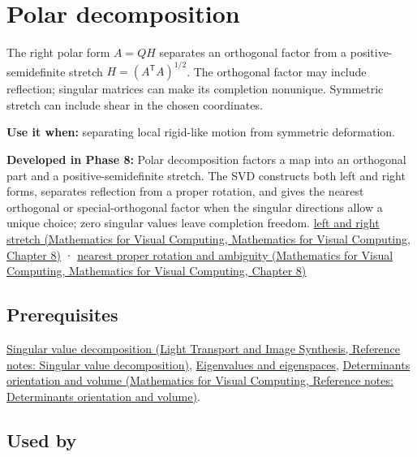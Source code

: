 \hypertarget{appendix-73f5bcf7a462}{}\label{referencestart:appendix-73f5bcf7a462}
\section{Polar decomposition}\label{appendix-73f5bcf7a462-polar-decomposition}

The right polar form \(A=QH\) separates an orthogonal factor from a positive-semidefinite stretch \(H=(A^\mathsf T A)^{1/2}\). The orthogonal factor may include reflection; singular matrices can make its completion nonunique. Symmetric stretch can include shear in the chosen coordinates.

\textbf{Use it when:} separating local rigid-like motion from symmetric deformation.

\textbf{Developed in Phase 8:} Polar decomposition factors a map into an orthogonal part and a positive-semidefinite stretch. The SVD constructs both left and right forms, separates reflection from a proper rotation, and gives the nearest orthogonal or special-orthogonal factor when the singular directions allow a unique choice; zero singular values leave completion freedom. \href{../02-Mathematics-for-Visual-Computing/main.pdf\#nameddest=02-foundations-ii-ch024-polar-decomposition-separates-frame-dependent-stretch-from-orientation}{left and right stretch (Mathematics for Visual Computing, Mathematics for Visual Computing, Chapter 8)} · \href{../02-Mathematics-for-Visual-Computing/main.pdf\#nameddest=02-foundations-ii-ch024-two-sided-rotations-nearest-proper-rotation-and-nonunique-directions}{nearest proper rotation and ambiguity (Mathematics for Visual Computing, Mathematics for Visual Computing, Chapter 8)}

\subsection{Prerequisites}\label{appendix-73f5bcf7a462-prerequisites}

\href{../04-Light-Transport-and-Image-Synthesis/main.pdf\#nameddest=appendix-1fad5e7f36fa}{Singular value decomposition (Light Transport and Image Synthesis, Reference notes: Singular value decomposition)}, \hyperref[appendix-0b3be18411f9]{Eigenvalues and eigenspaces}, \href{../02-Mathematics-for-Visual-Computing/main.pdf\#nameddest=appendix-da478be01d02}{Determinants orientation and volume (Mathematics for Visual Computing, Reference notes: Determinants orientation and volume)}.

\subsection{Used by}\label{appendix-73f5bcf7a462-used-by}

